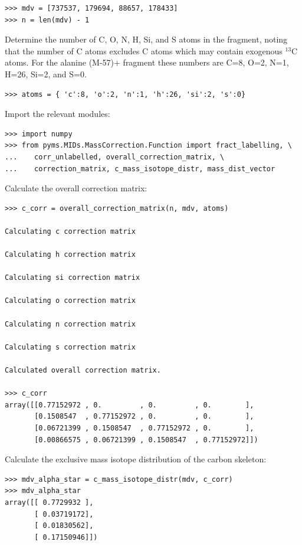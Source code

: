\begin{verbatim}
>>> mdv = [737537, 179694, 88657, 178433]
>>> n = len(mdv) - 1
\end{verbatim}

Determine the number of C, O, N, H, Si, and S atoms in the fragment,
noting that the number of C atoms excludes C atoms which may contain
exogenous $^{13}$C atoms. For the alanine (M-57)+ fragment these
numbers are C=8, O=2, N=1, H=26, Si=2, and S=0.

\begin{verbatim} 
>>> atoms = { 'c':8, 'o':2, 'n':1, 'h':26, 'si':2, 's':0}
\end{verbatim}

Import the relevant modules:

\begin{verbatim}
>>> import numpy
>>> from pyms.MIDs.MassCorrection.Function import fract_labelling, \
...    corr_unlabelled, overall_correction_matrix, \
...    correction_matrix, c_mass_isotope_distr, mass_dist_vector
\end{verbatim}

Calculate the overall correction matrix:

\begin{verbatim}
>>> c_corr = overall_correction_matrix(n, mdv, atoms)

Calculating c correction matrix

Calculating h correction matrix

Calculating si correction matrix

Calculating o correction matrix

Calculating n correction matrix

Calculating s correction matrix

Calculated overall correction matrix.

>>> c_corr 
array([[0.77152972 , 0.         , 0.         , 0.        ],
       [0.1508547  , 0.77152972 , 0.         , 0.        ],
       [0.06721399 , 0.1508547  , 0.77152972 , 0.        ],
       [0.00866575 , 0.06721399 , 0.1508547  , 0.77152972]])
\end{verbatim}

Calculate the exclusive mass isotope distribution of the carbon skeleton:

\begin{verbatim}
>>> mdv_alpha_star = c_mass_isotope_distr(mdv, c_corr)
>>> mdv_alpha_star 
array([[ 0.7729932 ],
       [ 0.03719172],
       [ 0.01830562],
       [ 0.17150946]])
\end{verbatim}

